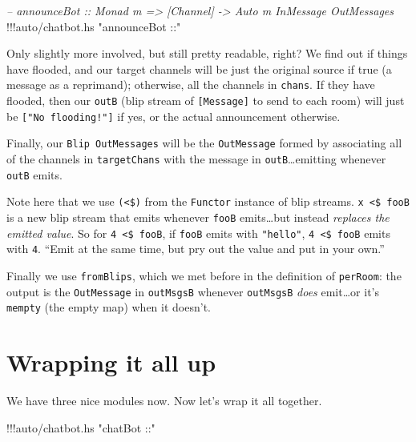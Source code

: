 \documentclass[]{article}
\newenvironment{Shaded}{}{}
\newcommand{\StringTok}[1]{\textcolor[rgb]{0.25,0.44,0.63}{{#1}}}
\newcommand{\CommentTok}[1]{\textcolor[rgb]{0.38,0.63,0.69}{\textit{{#1}}}}
\newcommand{\FunctionTok}[1]{\textcolor[rgb]{0.02,0.16,0.49}{{#1}}}
\newcommand{\NormalTok}[1]{{#1}}
\begin{document}
\begin{Shaded}
\begin{Highlighting}[]
\CommentTok{-- announceBot :: Monad m => [Channel] -> Auto m InMessage OutMessages}
\FunctionTok{!!!}\NormalTok{auto}\FunctionTok{/}\NormalTok{chatbot}\FunctionTok{.}\NormalTok{hs }\StringTok{"announceBot ::"}
\end{Highlighting}
\end{Shaded}

Only slightly more involved, but still pretty readable, right? We find
out if things have flooded, and our target channels will be just the
original source if true (a message as a reprimand); otherwise, all the
channels in \texttt{chans}. If they have flooded, then our \texttt{outB}
(blip stream of \texttt{{[}Message{]}} to send to each room) will just
be \texttt{{[}"No\ flooding!"{]}} if yes, or the actual announcement
otherwise.

Finally, our \texttt{Blip\ OutMessages} will be the \texttt{OutMessage}
formed by associating all of the channels in \texttt{targetChans} with
the message in \texttt{outB}\ldots{}emitting whenever \texttt{outB}
emits.

Note here that we use \texttt{(\textless{}\$)} from the \texttt{Functor}
instance of blip streams. \texttt{x\ \textless{}\$\ fooB} is a new blip
stream that emits whenever \texttt{fooB} emits\ldots{}but instead
\emph{replaces the emitted value}. So for
\texttt{4\ \textless{}\$\ fooB}, if \texttt{fooB} emits with
\texttt{"hello"}, \texttt{4\ \textless{}\$\ fooB} emits with \texttt{4}.
``Emit at the same time, but pry out the value and put in your own.''

Finally we use \texttt{fromBlips}, which we met before in the definition
of \texttt{perRoom}: the output is the \texttt{OutMessage} in
\texttt{outMsgsB} whenever \texttt{outMsgsB} \emph{does} emit\ldots{}or
it's \texttt{mempty} (the empty map) when it doesn't.

\section{Wrapping it all up}\label{wrapping-it-all-up}

We have three nice modules now. Now let's wrap it all together.

\begin{Shaded}
\begin{Highlighting}[]
\FunctionTok{!!!}\NormalTok{auto}\FunctionTok{/}\NormalTok{chatbot}\FunctionTok{.}\NormalTok{hs }\StringTok{"chatBot ::"}
\end{Highlighting}
\end{Shaded}
\end{document}
